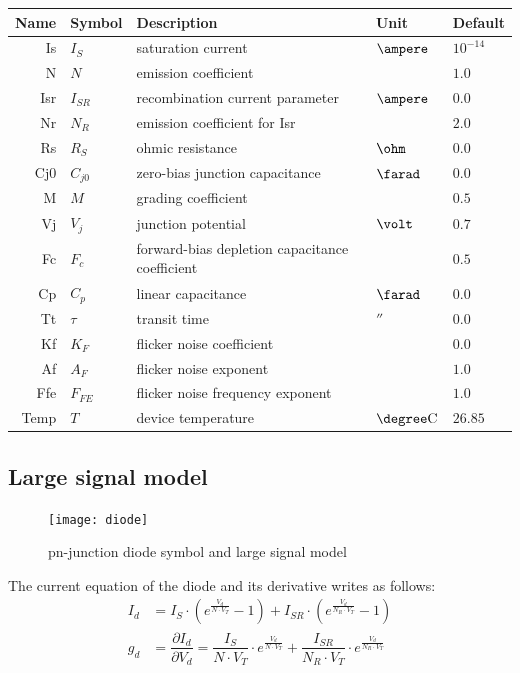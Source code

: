 \documentclass[10pt]{report}
\begin{document}
\begin{tabular}{rllll}
Name & Symbol & Description & Unit & Default\\
\hline
Is & $I_{S}$ & saturation current & $\ampere$ & $10^{-14}$\\
N & $N$ & emission coefficient & & $1.0$\\
Isr & $I_{SR}$ & recombination current parameter & $\ampere$ & $0.0$\\
Nr & $N_{R}$ & emission coefficient for Isr & & $2.0$\\
Rs & $R_{S}$ & ohmic resistance & $\ohm$ & $0.0$\\
Cj0 & $C_{j0}$ & zero-bias junction capacitance & $\farad$ & $0.0$\\
M & $M$ & grading coefficient & & $0.5$\\
Vj & $V_{j}$ & junction potential & $\volt$ & $0.7$\\
Fc & $F_{c}$ & forward-bias depletion capacitance coefficient & & $0.5$\\
Cp & $C_{p}$ & linear capacitance & $\farad$ & $0.0$\\
Tt & $\tau$ & transit time & $\second$ & $0.0$\\
Kf & $K_F$ & flicker noise coefficient & & $0.0$\\
Af & $A_F$ & flicker noise exponent & & $1.0$\\
Ffe & $F_{FE}$ & flicker noise frequency exponent & & $1.0$\\
Temp & $T$ & device temperature & $\degree \mathrm{C}$ & $26.85$
\end{tabular}

\addvspace{12pt}

\subsection{Large signal model}

\begin{figure}[ht]
\begin{center}
\texttt{[image: diode]}
\end{center}
\caption{pn-junction diode symbol and large signal model}
\label{fig:diode}
\end{figure}
\FloatBarrier

The current equation of the diode and its derivative writes as
follows:
\begin{align}
I_{d} &= I_{S}\cdot \left(e^{\frac{V_{d}}{N\cdot V_{T}}} - 1\right) + I_{SR}\cdot \left(e^{\frac{V_{d}}{N_R\cdot V_{T}}} - 1\right)\\
g_{d} &= \dfrac{\partial I_{d}}{\partial V_{d}} = \dfrac{I_{S}}{N\cdot V_{T}}\cdot e^{\frac{V_{d}}{N\cdot V_{T}}} + \dfrac{I_{SR}}{N_R\cdot V_{T}}\cdot e^{\frac{V_{d}}{N_R\cdot V_{T}}}
\end{align}
\end{document}
